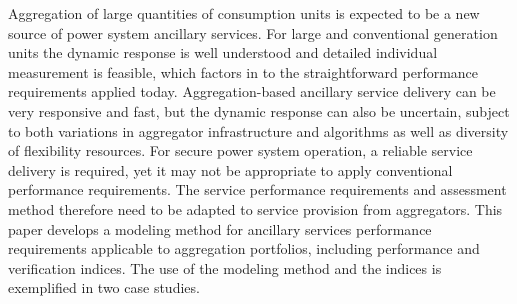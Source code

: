 Aggregation of large quantities of consumption units is expected to be a new source of power system ancillary services. For large and conventional   generation units the dynamic response is well understood and detailed individual measurement is feasible, which factors in to the straightforward performance requirements applied today. Aggregation-based ancillary service delivery can be very responsive and fast, but the dynamic response can also be uncertain, subject to both variations in aggregator infrastructure and algorithms as well as diversity of flexibility resources. For secure power system operation, a reliable service delivery is required, yet it may not be appropriate to apply conventional performance requirements. %
The service performance requirements and assessment method therefore need to be adapted to service provision from aggregators.  
This paper develops a modeling method for ancillary services performance requirements applicable to aggregation portfolios, %
including performance and verification indices. %
The use of the modeling method and the indices is exemplified in two case studies.
